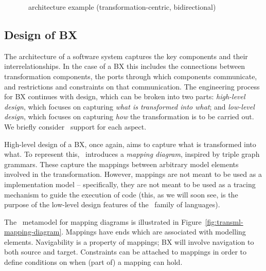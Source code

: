 \begin{figure}[htbp]
\caption{\transml\ architecture example (transformation-centric, bidirectional)}
\label{fig:architecture-example3}
\end{figure}

\subsection{Design of BX}
The architecture of a software system captures the key components and their interrelationships. In the case of a BX this includes the connections between transformation components, the ports through which components communicate, and restrictions and constraints on that communication. The engineering process for BX continues with design, which can be broken into two parts: \textit{high-level design}, which focuses on capturing \textit{what is transformed into what}; and \textit{low-level design}, which focuses on capturing \textit{how} the transformation is to be carried out. We briefly consider \transml\ support for each aspect.

High-level design of a BX, once again, aims to capture what is transformed into what. To represent this, \transml\ introduces a \textit{mapping diagram}, inspired by triple graph grammars. These capture the mappings between arbitrary model elements involved in the transformation. However, mappings are not meant to be used as a implementation model -- specifically, they are not meant to be used as a tracing mechanism to guide the execution of code (this, as we will soon see, is the purpose of the low-level design features of the \transml\ family of languages).

The \transml\ metamodel for mapping diagrams is illustrated in Figure~\ref{fig:transml-mapping-diagram}. Mappings have ends which are associated with modelling elements. Navigability is a property of mappings; BX will involve navigation to both source and target. Constraints can be attached to mappings in order to define conditions on when (part of) a mapping can hold. 

